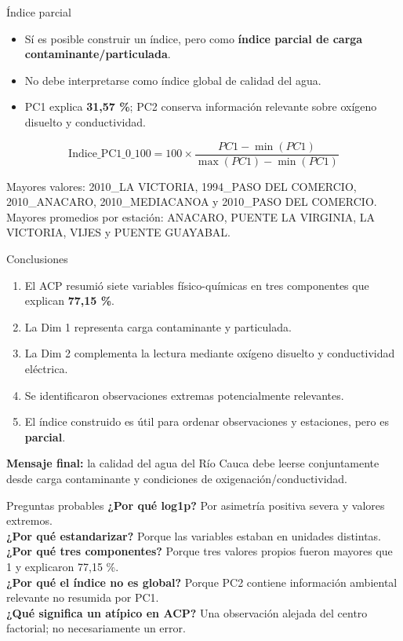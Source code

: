 \documentclass[aspectratio=169,11pt]{beamer}
\begin{document}
\begin{frame}{Índice parcial}
  \begin{itemize}
    \item Sí es posible construir un índice, pero como \textbf{índice parcial de carga contaminante/particulada}.
    \item No debe interpretarse como índice global de calidad del agua.
    \item PC1 explica \textbf{31,57 \%}; PC2 conserva información relevante sobre oxígeno disuelto y conductividad.
  \end{itemize}

  \[
    \text{Indice\_PC1\_0\_100} =
    100 \times \frac{PC1 - \min(PC1)}{\max(PC1) - \min(PC1)}
  \]

  \small
  Mayores valores: 2010\_LA VICTORIA, 1994\_PASO DEL COMERCIO, 2010\_ANACARO, 2010\_MEDIACANOA y 2010\_PASO DEL COMERCIO.\\
  Mayores promedios por estación: ANACARO, PUENTE LA VIRGINIA, LA VICTORIA, VIJES y PUENTE GUAYABAL.
\end{frame}

\begin{frame}{Conclusiones}
  \begin{enumerate}
    \item El ACP resumió siete variables físico-químicas en tres componentes que explican \textbf{77,15 \%}.
    \item La Dim 1 representa carga contaminante y particulada.
    \item La Dim 2 complementa la lectura mediante oxígeno disuelto y conductividad eléctrica.
    \item Se identificaron observaciones extremas potencialmente relevantes.
    \item El índice construido es útil para ordenar observaciones y estaciones, pero es \textbf{parcial}.
  \end{enumerate}

  \vspace{0.25cm}
  \textbf{Mensaje final:} la calidad del agua del Río Cauca debe leerse conjuntamente desde carga contaminante y condiciones de oxigenación/conductividad.
\end{frame}

\begin{frame}{Preguntas probables}
  \small
  \textbf{¿Por qué log1p?} Por asimetría positiva severa y valores extremos.\\[0.22cm]
  \textbf{¿Por qué estandarizar?} Porque las variables estaban en unidades distintas.\\[0.22cm]
  \textbf{¿Por qué tres componentes?} Porque tres valores propios fueron mayores que 1 y explicaron 77,15 \%.\\[0.22cm]
  \textbf{¿Por qué el índice no es global?} Porque PC2 contiene información ambiental relevante no resumida por PC1.\\[0.22cm]
  \textbf{¿Qué significa un atípico en ACP?} Una observación alejada del centro factorial; no necesariamente un error.
\end{frame}
\end{document}
